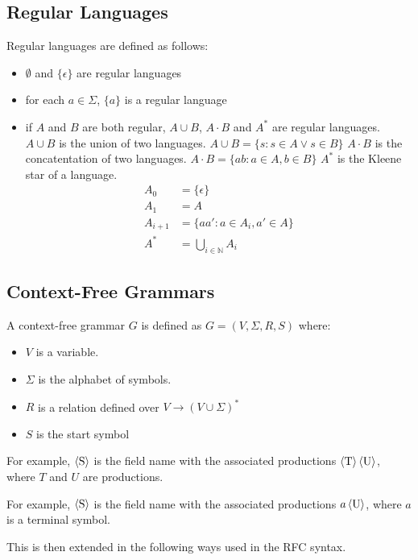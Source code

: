 \subsection{Regular Languages}
Regular languages are defined as follows:
\begin{itemize}
\item $\emptyset$ and $\{\epsilon\}$ are regular languages
\item for each $a\in\Sigma$, $\{a\}$ is a regular language
\item if $A$ and $B$ are both regular, $A\cup B$, $A\cdot B$ and $A^*$ are regular languages.
\subitem $A\cup B$ is the union of two languages.  $A\cup B = \{s : s\in A \lor s \in B\}$
\subitem $A\cdot B$ is the concatentation of two languages.  $A\cdot B = \{ ab : a \in A, b \in B\}$
\subitem $A^*$ is the Kleene star of a language. 
\begin{align*}
    A_0&=\{\epsilon\}\\
    A_1&= A\\
    A_{i+1} &= \{ aa' : a \in A_i, a'\in A\}\\
    A^* &= \bigcup_{i\in\mathbb N} A_i
\end{align*}
\end{itemize}

\subsection{Context-Free Grammars}
A context-free grammar $G$ is defined as $G=\left(V,\Sigma, R,S\right)$ where:
\begin{itemize}
\item $V$ is a variable.
\item $\Sigma$ is the alphabet of symbols.
\item $R$ is a relation defined over $V\rightarrow \left(V\cup\Sigma\right)^*$
\item $S$ is the start symbol
\end{itemize}

For example, $\langle \text S \rangle$ is the field name with the associated productions $\langle \text T \rangle \, \langle \text U \rangle$, where $T$ and $U$ are productions.
\begin{bnf*}
\end{bnf*}
For example, $\langle \text S \rangle$ is the field name with the associated productions $a \, \langle \text U \rangle$, where $a$ is a terminal symbol.
\begin{bnf*}
\end{bnf*}
This is then extended in the following ways used in the RFC syntax.

